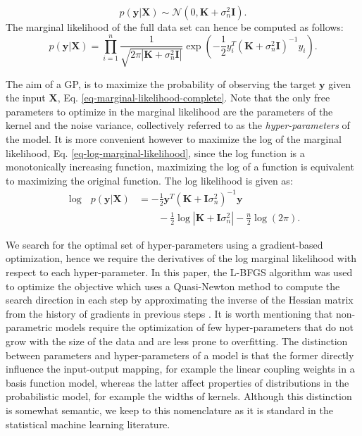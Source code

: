 \documentclass[useAMS,usenatbib,fleqn]{mn2e}
\begin{document}
\begin{equation}
p\left(\mathbf{y}|\mathbf{X}\right) \sim\mathcal{N} \left(0,\mathbf{K}+\sigma_{n}^{2}\mathbf{I}\right).
\label{eq-marginal-likelihood}
\end{equation}
The marginal likelihood of the full data set can hence be computed as follows:
\begin{equation}
p\left(\mathbf{y}|\mathbf{X}\right) = \prod_{i=1}^{n}\frac{1}{\sqrt{2\pi\left |\mathbf{K}+\sigma_{n}^{2}\mathbf{I}\right |}}\exp\left({-\frac{1}{2}y_{i}^{T}\left(\mathbf{K}+\sigma_{n}^{2}\mathbf{I}\right)^{-1}y_{i}}\right).
\label{eq-marginal-likelihood-complete}
\end{equation}

The aim of a GP, is to maximize the probability of observing the target $\mathbf{y}$ given the input $\mathbf{X}$, Eq. \eqref{eq-marginal-likelihood-complete}. Note that the only free parameters to optimize in the marginal likelihood are the parameters of the kernel and the noise variance, collectively referred to as the \emph{hyper-parameters} of the model. It is more convenient however to maximize the log of the marginal likelihood, Eq. \eqref{eq-log-marginal-likelihood}, since the log function is a monotonically increasing function, maximizing the log of a function is equivalent to maximizing the original function. The log likelihood is given as:
\begin{align}
\label{eq-log-marginal-likelihood}
\log\text{ }p(\mathbf{y}|\mathbf{X}) &= -\frac{1}{2}\mathbf{y}^{T}\left(\mathbf{K}+\mathbf{I}\sigma_{n}^{2} \right)^{-1}\mathbf{y} \nonumber \\
&\qquad -\frac{1}{2} \log\left | \mathbf{K}+\mathbf{I}\sigma_{n}^{2}\right|-\frac{n}{2}\log(2\pi).
\end{align}

We search for the optimal set of hyper-parameters using a gradient-based optimization, hence we require the derivatives of the log marginal likelihood with respect to each hyper-parameter. In this paper, the L-BFGS algorithm was used to optimize the objective which uses a Quasi-Newton method to compute the search direction in each step by approximating the inverse of the Hessian matrix from the history of gradients in previous steps \citep{jorge1980,schmidt2005}. It is worth mentioning that non-parametric models require the optimization of few hyper-parameters that do not grow with the size of the data and are less prone to overfitting. The distinction between parameters and hyper-parameters of a model is that the former directly influence the input-output mapping, for example the linear coupling weights in a basis function model, whereas the latter affect properties of distributions in the probabilistic model, for example the widths of kernels. Although this distinction is somewhat semantic, we keep to this nomenclature as it is standard in the statistical machine learning literature.
\end{document}
